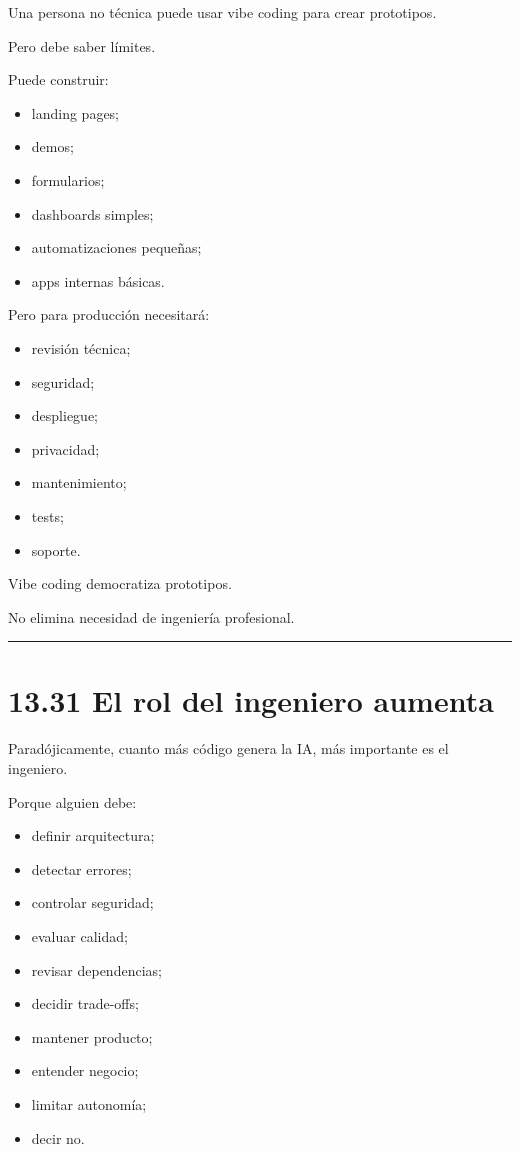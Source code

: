 Una persona no técnica puede usar vibe coding para crear prototipos.

Pero debe saber límites.

Puede construir:

\begin{itemize}
\tightlist
\item
  landing pages;
\item
  demos;
\item
  formularios;
\item
  dashboards simples;
\item
  automatizaciones pequeñas;
\item
  apps internas básicas.
\end{itemize}

Pero para producción necesitará:

\begin{itemize}
\tightlist
\item
  revisión técnica;
\item
  seguridad;
\item
  despliegue;
\item
  privacidad;
\item
  mantenimiento;
\item
  tests;
\item
  soporte.
\end{itemize}

Vibe coding democratiza prototipos.

No elimina necesidad de ingeniería profesional.

\begin{center}\rule{0.5\linewidth}{0.5pt}\end{center}

\section{13.31 El rol del ingeniero
aumenta}\label{el-rol-del-ingeniero-aumenta}

Paradójicamente, cuanto más código genera la IA, más importante es el
ingeniero.

Porque alguien debe:

\begin{itemize}
\tightlist
\item
  definir arquitectura;
\item
  detectar errores;
\item
  controlar seguridad;
\item
  evaluar calidad;
\item
  revisar dependencias;
\item
  decidir trade-offs;
\item
  mantener producto;
\item
  entender negocio;
\item
  limitar autonomía;
\item
  decir no.
\end{itemize}

